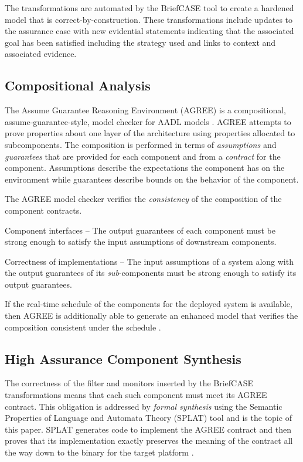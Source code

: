 The transformations are automated by the BriefCASE tool to create a hardened model that is correct-by-construction.  
These transformations include updates to the assurance case with new evidential statements indicating that the associated goal has been satisfied including the strategy used and links to context and associated evidence.  

\subsection{Compositional Analysis}

The Assume Guarantee Reasoning Environment (AGREE) is a compositional, assume-guarantee-style, model checker for AADL models \cite{compositional-analysis-agree}. 
AGREE attempts to prove properties about one layer of the architecture using properties allocated to subcomponents.
The composition is performed in terms of \emph{assumptions} and \emph{guarantees} that are provided for each component and from a \emph{contract} for the component.
Assumptions describe the expectations the component has on the environment while guarantees describe bounds on the behavior of the component.

The AGREE model checker verifies the \emph{consistency} of the composition of the component contracts.
\begin{compactenum}
\item Component interfaces -- The output guarantees of each component must be strong enough to
satisfy the input assumptions of downstream components. 
\item Correctness of implementations -- The input assumptions of a system along with the 
output guarantees of its \emph{sub}-components must be strong enough to satisfy its output guarantees.
\end{compactenum}
If the real-time schedule of the components for the deployed system is available, then AGREE is additionally able to generate an enhanced model that verifies the composition consistent under the schedule \cite{nfm:agree}.

\subsection{High Assurance Component Synthesis}

The correctness of the filter and monitors inserted by the BriefCASE transformations means that each such component must meet its AGREE contract.
This obligation is addressed by \emph{formal synthesis} using the Semantic Properties of Language
and Automata Theory (SPLAT) tool and is the topic of this paper.
SPLAT generates code to implement the AGREE contract and then proves that its implementation exactly preserves the meaning of the contract all the way down to the binary for the target platform \cite{case-models-2021}.

